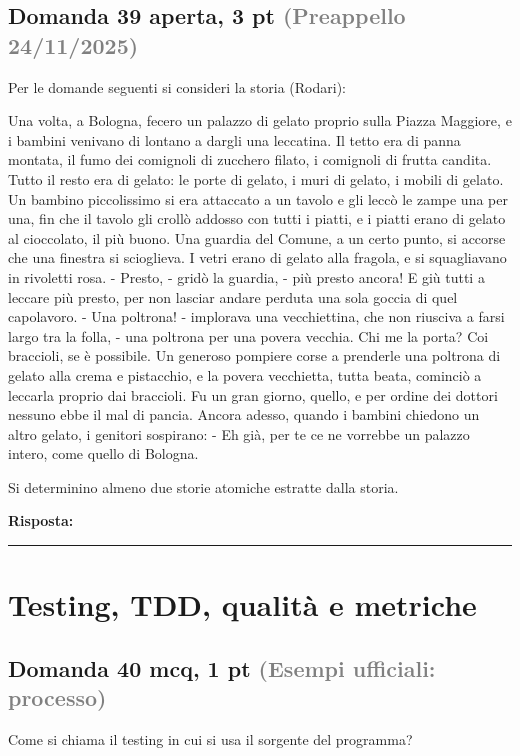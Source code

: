 \documentclass[a4paper,11pt]{article}
\begin{document}
\subsection*{Domanda 39 \hfill {\small aperta, 3 pt \textcolor{gray}{(Preappello 24/11/2025)}}}
\begin{tcolorbox}[colback=gray!8,colframe=gray!50,title=Contesto]
Per le domande seguenti si consideri la storia (Rodari):

Una volta, a Bologna, fecero un palazzo di gelato proprio sulla Piazza Maggiore, e i bambini venivano di lontano a dargli una leccatina. Il tetto era di panna montata, il fumo dei comignoli di zucchero filato, i comignoli di frutta candita. Tutto il resto era di gelato: le porte di gelato, i muri di gelato, i mobili di gelato. Un bambino piccolissimo si era attaccato a un tavolo e gli leccò le zampe una per una, fin che il tavolo gli crollò addosso con tutti i piatti, e i piatti erano di gelato al cioccolato, il più buono. Una guardia del Comune, a un certo punto, si accorse che una finestra si scioglieva. I vetri erano di gelato alla fragola, e si squagliavano in rivoletti rosa. - Presto, - gridò la guardia, - più presto ancora! E giù tutti a leccare più presto, per non lasciar andare perduta una sola goccia di quel capolavoro. - Una poltrona! - implorava una vecchiettina, che non riusciva a farsi largo tra la folla, - una poltrona per una povera vecchia. Chi me la porta? Coi braccioli, se è possibile. Un generoso pompiere corse a prenderle una poltrona di gelato alla crema e pistacchio, e la povera vecchietta, tutta beata, cominciò a leccarla proprio dai braccioli. Fu un gran giorno, quello, e per ordine dei dottori nessuno ebbe il mal di pancia. Ancora adesso, quando i bambini chiedono un altro gelato, i genitori sospirano: - Eh già, per te ce ne vorrebbe un palazzo intero, come quello di Bologna.
\end{tcolorbox}
Si determinino almeno due storie atomiche estratte dalla storia.

\vspace{0.2cm}
\noindent\textbf{Risposta:}\par
\vspace{4cm}\hrule


\section{Testing, TDD, qualità e metriche}

\subsection*{Domanda 40 \hfill {\small mcq, 1 pt \textcolor{gray}{(Esempi ufficiali: processo)}}}
Come si chiama il testing in cui si usa il sorgente del programma?
\end{document}
